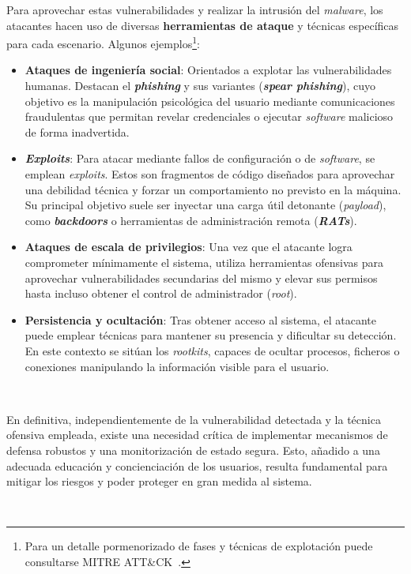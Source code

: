 Para aprovechar estas vulnerabilidades y realizar la intrusión del \textit{malware}, los atacantes hacen uso de diversas \textbf{herramientas de ataque} y técnicas específicas para cada escenario.
Algunos ejemplos\footnote{Para un detalle pormenorizado de fases y técnicas de explotación puede consultarse MITRE ATT\&CK~\cite{mitre_attack}.}:
\begin{itemize}
    \item \textbf{Ataques de ingeniería social}: Orientados a explotar las vulnerabilidades humanas. Destacan el \textbf{\textit{phishing}} y sus variantes (\textbf{\textit{spear phishing}}),
    cuyo objetivo es la manipulación psicológica del usuario mediante comunicaciones fraudulentas que permitan revelar credenciales o ejecutar \textit{software} malicioso de forma inadvertida.
    \item \textbf{\textit{Exploits}}: Para atacar mediante fallos de configuración o de \textit{software}, se emplean \textit{exploits}.
    Estos son fragmentos de código diseñados para aprovechar una debilidad técnica y forzar un comportamiento no previsto en la máquina.
    Su principal objetivo suele ser inyectar una carga útil detonante (\textit{payload}), como \textbf{\textit{backdoors}} o herramientas de administración remota (\textbf{\textit{RATs}}).
    \item \textbf{Ataques de escala de privilegios}: Una vez que el atacante logra comprometer mínimamente el sistema,
    utiliza herramientas ofensivas para aprovechar vulnerabilidades secundarias del mismo y elevar sus permisos hasta incluso obtener el control de administrador (\textit{root}).
    \item \textbf{Persistencia y ocultación}: Tras obtener acceso al sistema, el atacante puede emplear técnicas para mantener su presencia y dificultar su detección.
    En este contexto se sitúan los \textit{rootkits}, capaces de ocultar procesos, ficheros o conexiones manipulando la información visible para el usuario.
\end{itemize}

\

En definitiva, independientemente de la vulnerabilidad detectada y la técnica ofensiva empleada, existe una necesidad crítica de implementar mecanismos de defensa robustos y una monitorización de estado segura.
Esto, añadido a una adecuada educación y concienciación de los usuarios, resulta fundamental para mitigar los riesgos y poder proteger en gran medida al sistema.

\

